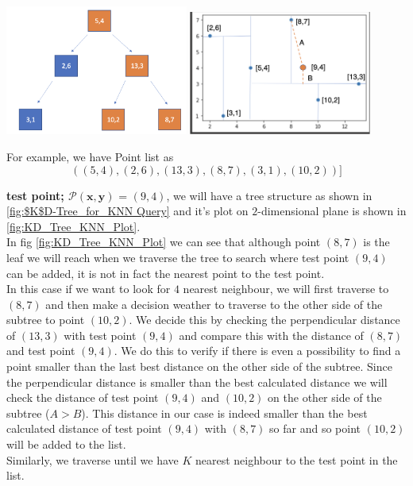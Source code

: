\begin{mscexample}


    \begin{minipage}[t]{\linewidth}
        \centering
        \includegraphics[width=6cm]{graphs/KD-Tree_KNN_Tree.png}
        \label{fig:$K$D-Tree_for_KNN Query}
        \hfill
        \includegraphics[width=6cm]{graphs/KD-Tree_KNN_plot.png}
        \label{fig:KD_Tree_KNN_Plot}
    \end{minipage}
	For example, we have Point list as $$((5,4),(2,6),(13,3),(8,7),(3,1),(10,2))]$$ 
	
	\textbf{test point; $\mathcal{P}(\boldsymbol{x}, \boldsymbol{y})$} = $(9,4)$, we will have a tree structure as shown in \ref{fig:$K$D-Tree_for_KNN Query} and it's plot on $2$-dimensional plane is shown in \ref{fig:KD_Tree_KNN_Plot}. \\
	In fig \ref{fig:KD_Tree_KNN_Plot} we can see that although point $(8,7)$ is the leaf we will reach when we traverse the tree to search where test point $(9,4)$ can be added, it is not in fact the nearest point to the test point. \\
	In this case if we want to look for $4$ nearest neighbour, we will first traverse to $(8,7)$ and then make a decision weather to traverse to the other side of the subtree to point $(10,2)$. We decide this by checking the perpendicular distance of $(13,3)$ with test point $(9,4)$ and compare this with the distance of $(8,7)$ and test point $(9,4)$. We do this to verify if there is even a possibility to find a point smaller than the last best distance on the other side of the subtree. Since the perpendicular distance is smaller than the best calculated distance we will check the distance of test point $(9,4)$ and $(10,2)$ on the other side of the subtree ($A > B$). This distance in our case is indeed smaller than the best calculated distance of test point $(9,4)$ with $(8,7)$ so far and so point $(10,2)$ will be added to the list.\\
	Similarly, we traverse until we have $K$ nearest neighbour to the test point in the list.
\end{mscexample}



